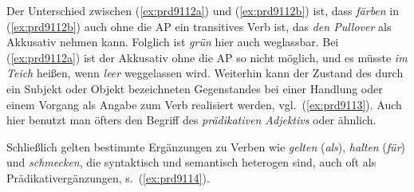 \begin{exe}
  \ex\label{ex:prd9112}
  \begin{xlist}
  \end{xlist}
\end{exe}

Der Unterschied zwischen (\ref{ex:prd9112a}) und (\ref{ex:prd9112b}) ist, dass \textit{färben} in (\ref{ex:prd9112b}) auch ohne die AP ein transitives Verb ist, das \textit{den Pullover} als Akkusativ nehmen kann.
Folglich ist \textit{grün} hier auch weglassbar.
Bei (\ref{ex:prd9112a}) ist der Akkusativ ohne die AP so nicht möglich, und es müsste \textit{im Teich} heißen, wenn \textit{leer} weggelassen wird.
Weiterhin kann der Zustand des durch ein Subjekt oder Objekt bezeichneten Gegenstandes bei einer Handlung oder einem Vorgang als Angabe zum Verb realisiert werden, vgl.\ (\ref{ex:prd9113}).
Auch hier benutzt man öfters den Begriff des \textit{prädikativen Adjektivs} oder ähnlich.

\begin{exe}
\end{exe}

Schließlich gelten bestimmte Ergänzungen zu Verben wie \textit{gelten} (\textit{als}), \textit{halten} (\textit{für}) und \textit{schmecken}, die syntaktisch und semantisch heterogen sind, auch oft als Prädikativergänzungen, s.\ (\ref{ex:prd9114}).

\begin{exe}
  \ex\label{ex:prd9114} 
  \begin{xlist}
  \end{xlist}
\end{exe}

